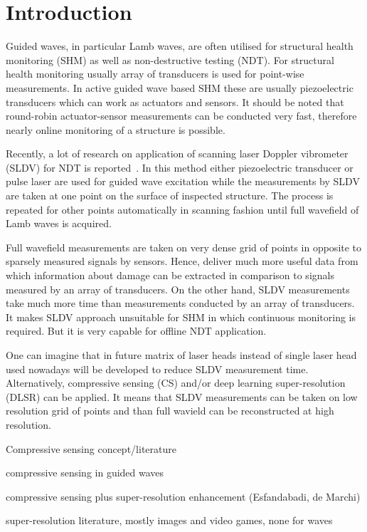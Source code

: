 \section{Introduction}
Guided waves, in particular Lamb waves, are often utilised for structural health monitoring (SHM) as well as non-destructive testing (NDT).
For structural health monitoring usually array of transducers is used for point-wise measurements.
In active guided wave based SHM these are usually piezoelectric transducers which can work as actuators and sensors.
It should be noted that round-robin actuator-sensor measurements can be conducted very fast, therefore nearly online monitoring of a structure is possible.

Recently, a lot of research on application of scanning laser Doppler vibrometer (SLDV) for NDT is reported~\cite{Flynn2013,Kudela2015,Kudela2018d,Segers2021,Segers2022}. 
In this method either piezoelectric transducer or pulse laser are used for guided wave excitation while the measurements by SLDV are taken at one point on the surface of inspected structure.
The process is repeated for other points automatically in scanning fashion until full wavefield of Lamb waves is acquired.

Full wavefield measurements are taken on very dense grid of points in opposite to sparsely measured signals by sensors.
Hence, deliver much more useful data from which information about damage can be extracted in comparison to signals measured by an array of transducers.
On the other hand, SLDV measurements take much more time than measurements conducted by an array of transducers.
It makes SLDV approach unsuitable for SHM in which continuous monitoring is required.
But it is very capable for offline NDT application.

One can imagine that in future matrix of laser heads instead of single laser head used nowadays will be developed to reduce SLDV measurement time.
Alternatively, compressive sensing (CS) and/or deep learning super-resolution (DLSR) can be applied.
It means that SLDV measurements can be taken on low resolution grid of points and than full wavield can be reconstructed at high resolution.



{\color{RubineRed}

Compressive sensing concept/literature

compressive sensing in guided waves

compressive sensing plus super-resolution enhancement (Esfandabadi, de Marchi)

super-resolution literature, mostly images and video games, none for waves

}

